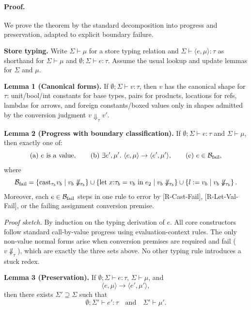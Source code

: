 \documentclass[11pt,a4paper]{article}
\begin{document}
\paragraph{Proof.}
We prove the theorem by the standard decomposition into progress and preservation, adapted to explicit boundary failure.

\medskip
\noindent\textbf{Store typing.}
Write $\Sigma \vdash \mu$ for a store typing relation and $\Sigma \vdash \langle e,\mu\rangle : \tau$ as shorthand for $\Sigma \vdash \mu$ and $\emptyset;\Sigma \vdash e:\tau$.
Assume the usual lookup and update lemmas for $\Sigma$ and $\mu$.

\medskip
\noindent\textbf{Lemma 1 (Canonical forms).}
If $\emptyset;\Sigma \vdash v:\tau$, then $v$ has the canonical shape for $\tau$:
unit/bool/int constants for base types, pairs for products, locations for refs, lambdas for arrows, and foreign constants/boxed values only in shapes admitted by the conversion judgment $v\Downarrow_{\tau}v'$.

\medskip
\noindent\textbf{Lemma 2 (Progress with boundary classification).}
If $\emptyset;\Sigma \vdash e:\tau$ and $\Sigma \vdash \mu$, then exactly one of:
\[
\text{(a) } e \text{ is a value},\qquad
\text{(b) } \exists e',\mu'.\ \langle e,\mu\rangle\to\langle e',\mu'\rangle,\qquad
\text{(c) } e \in \mathcal{B}_{\textnormal{fail}},
\]
where
\[
\mathcal{B}_{\textnormal{fail}}
=
\left\{
\text{cast}_{\tau_b}v_b \mid v_b\not\Downarrow_{\tau_b}
\right\}
\cup
\left\{
\text{let}\;x{:}\tau_b=v_b\ \text{in}\;e_2 \mid v_b\not\Downarrow_{\tau_b}
\right\}
\cup
\left\{
l:=v_b \mid v_b\not\Downarrow_{\tau_b}
\right\}.
\]
Moreover, each $e\in\mathcal{B}_{\textnormal{fail}}$ steps in one rule to $\text{error}$ by \textsf{[R-Cast-Fail]}, \textsf{[R-Let-Val-Fail]}, or the failing assignment conversion premise.

\emph{Proof sketch.}
By induction on the typing derivation of $e$.
All core constructors follow standard call-by-value progress using evaluation-context rules.
The only non-value normal forms arise when conversion premises are required and fail ($v\not\Downarrow_{\tau}$), which are exactly the three sets above.
No other typing rule introduces a stuck redex.

\medskip
\noindent\textbf{Lemma 3 (Preservation).}
If $\emptyset;\Sigma \vdash e:\tau$, $\Sigma\vdash\mu$, and
\[
\langle e,\mu\rangle\to\langle e',\mu'\rangle,
\]
then there exists $\Sigma'\supseteq\Sigma$ such that
\[
\emptyset;\Sigma' \vdash e':\tau
\quad\text{and}\quad
\Sigma' \vdash \mu'.
\]
\end{document}
